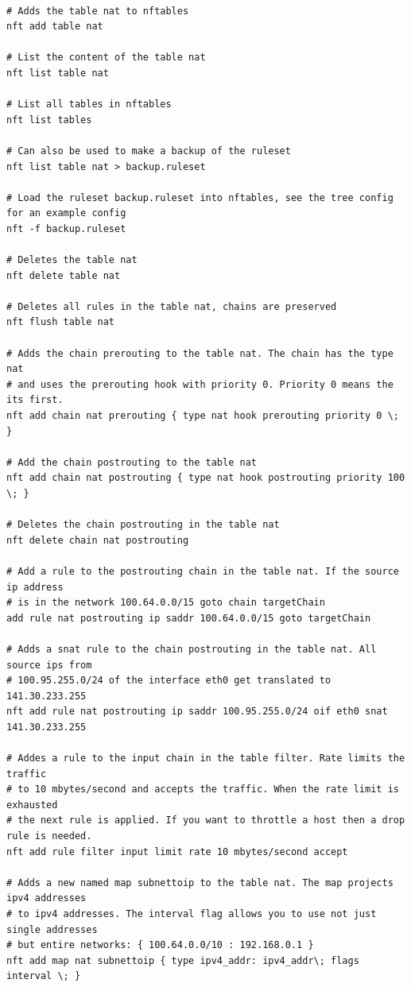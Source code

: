 \documentclass{report}
\begin{document}
\begingroup
\fontsize{9pt}{9pt}\selectfont
\begin{verbatim}

# Adds the table nat to nftables
nft add table nat

# List the content of the table nat
nft list table nat

# List all tables in nftables
nft list tables

# Can also be used to make a backup of the ruleset
nft list table nat > backup.ruleset

# Load the ruleset backup.ruleset into nftables, see the tree config for an example config
nft -f backup.ruleset

# Deletes the table nat
nft delete table nat

# Deletes all rules in the table nat, chains are preserved
nft flush table nat

# Adds the chain prerouting to the table nat. The chain has the type nat
# and uses the prerouting hook with priority 0. Priority 0 means the its first.
nft add chain nat prerouting { type nat hook prerouting priority 0 \; }

# Add the chain postrouting to the table nat
nft add chain nat postrouting { type nat hook postrouting priority 100 \; }

# Deletes the chain postrouting in the table nat
nft delete chain nat postrouting

# Add a rule to the postrouting chain in the table nat. If the source ip address
# is in the network 100.64.0.0/15 goto chain targetChain
add rule nat postrouting ip saddr 100.64.0.0/15 goto targetChain

# Adds a snat rule to the chain postrouting in the table nat. All source ips from
# 100.95.255.0/24 of the interface eth0 get translated to 141.30.233.255
nft add rule nat postrouting ip saddr 100.95.255.0/24 oif eth0 snat 141.30.233.255

# Addes a rule to the input chain in the table filter. Rate limits the traffic 
# to 10 mbytes/second and accepts the traffic. When the rate limit is exhausted 
# the next rule is applied. If you want to throttle a host then a drop rule is needed.
nft add rule filter input limit rate 10 mbytes/second accept

# Adds a new named map subnettoip to the table nat. The map projects ipv4 addresses
# to ipv4 addresses. The interval flag allows you to use not just single addresses 
# but entire networks: { 100.64.0.0/10 : 192.168.0.1 }
nft add map nat subnettoip { type ipv4_addr: ipv4_addr\; flags interval \; }


\end{verbatim}
\end{document}
